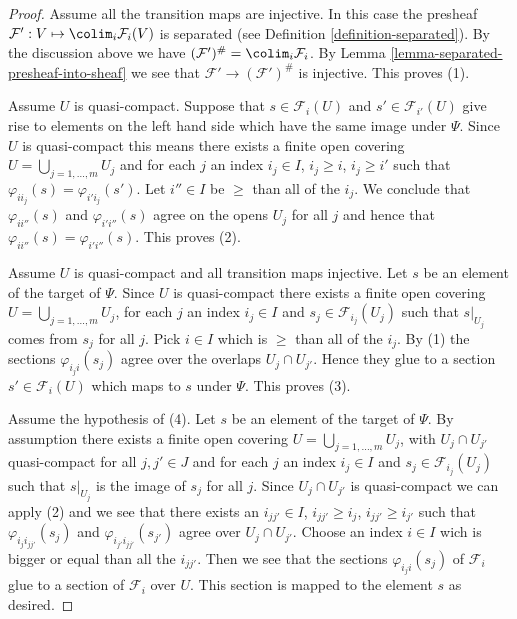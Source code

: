 \begin{proof}
Assume all the transition maps are injective. In this case the presheaf
$\mathcal{F}' : V \mapsto \colim_i \mathcal{F}_i(V)$ is
separated (see Definition \ref{definition-separated}).
By the discussion above we have
$(\mathcal{F}')^\# = \colim_i \mathcal{F}_i$.
By Lemma \ref{lemma-separated-presheaf-into-sheaf} we see that
$\mathcal{F}' \to (\mathcal{F}')^\#$ is injective. This proves (1).

\medskip\noindent
Assume $U$ is quasi-compact.
Suppose that $s \in \mathcal{F}_i(U)$ and
$s' \in \mathcal{F}_{i'}(U)$ give rise to elements on
the left hand side which have the same image under $\Psi$.
Since $U$ is quasi-compact this means there exists
a finite open covering $U = \bigcup_{j = 1, \ldots, m} U_j$
and for each $j$ an index $i_j \in I$, $i_j \geq i$, $i_j \geq i'$
such that $\varphi_{ii_j}(s) = \varphi_{i'i_j}(s')$.
Let $i''\in I$ be $\geq$ than all of the $i_j$.
We conclude that $\varphi_{ii''}(s)$ and $\varphi_{i'i''}(s)$
agree on the opens $U_j$ for all $j$ and hence that
$\varphi_{ii''}(s) = \varphi_{i'i''}(s)$. This proves (2).

\medskip\noindent
Assume $U$ is quasi-compact and all transition maps injective.
Let $s$ be an element of the target of $\Psi$.
Since $U$ is quasi-compact
there exists a finite open covering $U = \bigcup_{j = 1, \ldots, m} U_j$,
for each $j$ an index $i_j \in I$ and $s_j \in \mathcal{F}_{i_j}(U_j)$
such that $s|_{U_j}$ comes from $s_j$ for all $j$.
Pick $i \in I$ which is $\geq$ than all of the $i_j$.
By (1) the sections $\varphi_{i_ji}(s_j)$ agree over the
overlaps $U_j \cap U_{j'}$. Hence they glue to a section
$s' \in \mathcal{F}_i(U)$ which maps to $s$ under $\Psi$.
This proves (3).

\medskip\noindent
Assume the hypothesis of (4).
Let $s$ be an element of the target of $\Psi$.
By assumption there  exists a finite open covering
$U = \bigcup_{j = 1, \ldots, m} U_j$, with $U_j \cap U_{j'}$
quasi-compact for all $j, j' \in J$ and
for each $j$ an index $i_j \in I$ and $s_j \in \mathcal{F}_{i_j}(U_j)$
such that $s|_{U_j}$ is the image of $s_j$ for all $j$.
Since $U_j \cap U_{j'}$ is quasi-compact we can apply (2)
and we see that there exists an $i_{jj'} \in I$,
$i_{jj'} \geq i_j$, $i_{jj'} \geq i_{j'}$ such that
$\varphi_{i_ji_{jj'}}(s_j)$ and $\varphi_{i_{j'}i_{jj'}}(s_{j'})$
agree over $U_j \cap U_{j'}$. Choose an index $i \in I$
wich is bigger or equal than all the $i_{jj'}$. Then we see that
the sections $\varphi_{i_ji}(s_j)$ of $\mathcal{F}_i$ glue
to a section of $\mathcal{F}_i$ over $U$. This section is mapped
to the element $s$ as desired.
\end{proof}

